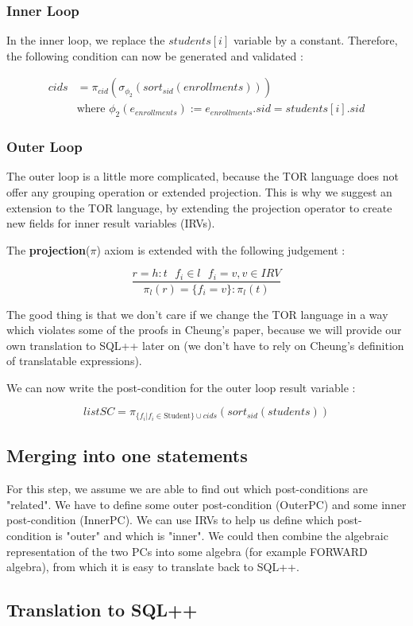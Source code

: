 \documentclass[11pt]{article}
\begin{document}
\subsubsection{Inner Loop}

In the inner loop, we replace the $students[i]$ variable by a constant. Therefore, the following condition can now be generated and validated :

\begin{equation}
\begin{split}
cids & = \pi_{cid} ( \sigma_{\phi_2}  (sort_{sid} (enrollments) ) )\\
& \text{where } \phi_2 (e_{enrollments}) := e_{enrollments}.sid = students[i].sid 
\end{split}
\end{equation}

\subsubsection{Outer Loop}

The outer loop is a little more complicated, because the TOR language does not offer any grouping operation or extended projection. This is why we suggest an extension to the TOR language, by extending the projection operator to create new fields for inner result variables (IRVs).

The \textbf{projection}($\pi$) axiom is extended with the following judgement :

$$
\frac{r = h:t \text{ } f_i \in l \text{ } f_i = v, v \in IRV}{\pi_l (r) = \{ f_i = v \} : \pi_l (t) }
$$

The good thing is that we don't care if we change the TOR language in a way which violates some of the proofs in Cheung's paper, because we will provide our own translation to SQL++ later on (we don't have to rely on Cheung's definition of translatable expressions).

We can now write the post-condition for the outer loop result variable :

$$
listSC = \pi_{\{f_i | f_i \in \text{Student} \} \cup cids } ( sort_{sid} (students) )
$$

\subsection{Merging into one statements}

For this step, we assume we are able to find out which post-conditions are "related". We have to define some outer post-condition (OuterPC) and some inner post-condition (InnerPC). We can use IRVs to help us define which post-condition is "outer" and which is "inner". We could then combine the algebraic representation of the two PCs into some algebra (for example FORWARD algebra), from which it is easy to translate back to SQL++.

\subsection{Translation to SQL++}
\end{document}
